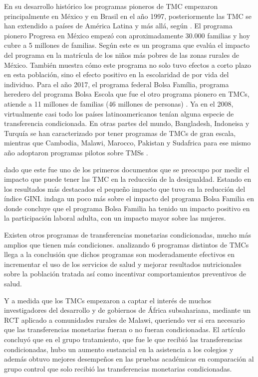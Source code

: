 \documentclass[AER]{AEA}
\begin{document}
En su desarrollo histórico los programas pioneros de TMC empezaron principalmente en México y en Brasil en el año 1997, posteriormente las TMC se han extendido a países de América Latina y más allá, según \cite{Sugiyama2011TheAmericas}. El programa pionero Progresa en México empezó con aproximadamente 30.000 familias y hoy cubre a 5 millones de familias. Según \cite{Schultz2004SchoolProgram} este es un programa que evalúa el impacto del programa en la matrícula de los niños más pobres de las zonas rurales de México. También muestra cómo este programa no solo tuvo efectos a corto plazo en esta población, sino el efecto positivo en la escolaridad de por vida del individuo. Para el año 2017, el programa federal Bolsa Família, programa heredero del programa Bolsa Escola que fue el otro programa pionero en TMCs, atiende a 11 millones de familias (46 millones de personas) \citep{Fiszbein2009ConditionalReport}. Ya en el 2008, virtualmente casi todo los países latinoamericanos tenían alguna especie de transferencia condicionada. En otras partes del mundo, Bangladesh, Indoneisa y Turquía se han caracterizado por tener programas de TMCs de gran escala, mientras que Cambodia, Malawi, Marocco, Pakistan y Sudafrica para ese mismo año adoptaron programas pilotos sobre TMSs \citep{Fiszbein2009ConditionalReport}.

\cite{Soares2007ConditionalPaper} dado que este fue uno de los primeros documentos que se preocupo por medir el impacto que puede tener las TMC en la reducción de la desigualdad. Estando en los resultados más destacados el pequeño impacto que tuvo en la reducción del índice GINI.\cite{Soares2010EvaluatingPerspective} indaga un poco más sobre el impacto del programa Bolsa Familia en donde concluye que el programa Bolsa Familia ha tenido un impacto positivo en la participación laboral adulta, con un impacto mayor sobre las mujeres.

Existen otros programas de transferencias monetarias condicionadas, mucho más amplios que tienen más condiciones. \cite{Lagarde2007ConditionalReview} analizando 6 programas distintos de TMCs llega a la conclusión que dichos programas son moderadamente efectivos en incrementar el uso de los servicios de salud y mejorar resultados nutricionales sobre la población tratada así como incentivar comportamientos preventivos de salud. 

Y a medida que los TMCs empezaron a captar el interés de muchos investigadores del desarrollo y de gobiernos de África subsahariana, \cite{Baird2011} mediante un RCT aplicado a comunidades rurales de Malawi, queriendo ver si era necesario que las transferencias monetarias fueran o no fueran condicionadas. El artículo concluyó que en el grupo tratamiento, que fue le que recibió las transferencias condicionadas, hubo un aumento sustancial en la asistencia a los colegios y además obtuvo mejores desempeños en las pruebas académicas en comparación al grupo control que solo recibió las transferencias monetarias condicionadas. 
\end{document}
